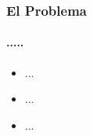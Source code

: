 
\begin{frame}
\frametitle{El Problema}
\framesubtitle{.....}

\begin{itemize}
	\item<1-> ...
	\item<2-> ...
	\item<3-> ...
\end{itemize}
\end{frame}

